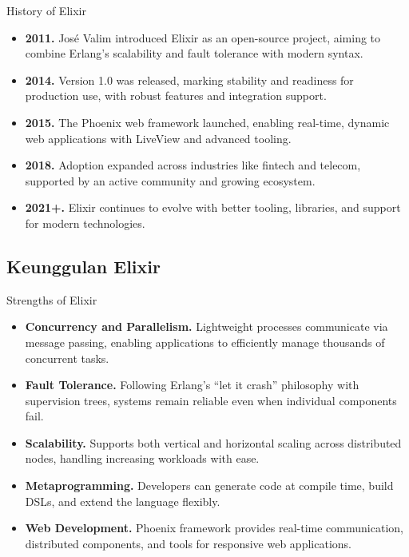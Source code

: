 \documentclass[aspectratio=169, table]{beamer}
\begin{document}
\begin{frame}{History of Elixir}
	\vspace{20pt}
	\begin{itemize}
		\item \textbf{2011.} José Valim introduced Elixir as an open-source project, aiming to combine Erlang’s scalability and fault tolerance with modern syntax.  
		\item \textbf{2014.} Version 1.0 was released, marking stability and readiness for production use, with robust features and integration support.  
		\item \textbf{2015.} The Phoenix web framework launched, enabling real-time, dynamic web applications with LiveView and advanced tooling.  
		\item \textbf{2018.} Adoption expanded across industries like fintech and telecom, supported by an active community and growing ecosystem.  
		\item \textbf{2021+.} Elixir continues to evolve with better tooling, libraries, and support for modern technologies.  
	\end{itemize}
\end{frame}

\subsection{Keunggulan Elixir}

\begin{frame}{Strengths of Elixir}
	\vspace{20pt}
	\begin{itemize}
		\item \textbf{Concurrency and Parallelism.} Lightweight processes communicate via message passing, enabling applications to efficiently manage thousands of concurrent tasks.  
		\item \textbf{Fault Tolerance.} Following Erlang’s “let it crash” philosophy with supervision trees, systems remain reliable even when individual components fail.  
		\item \textbf{Scalability.} Supports both vertical and horizontal scaling across distributed nodes, handling increasing workloads with ease.  
		\item \textbf{Metaprogramming.} Developers can generate code at compile time, build DSLs, and extend the language flexibly.  
		\item \textbf{Web Development.} Phoenix framework provides real-time communication, distributed components, and tools for responsive web applications.  
	\end{itemize}
\end{frame}
\end{document}
